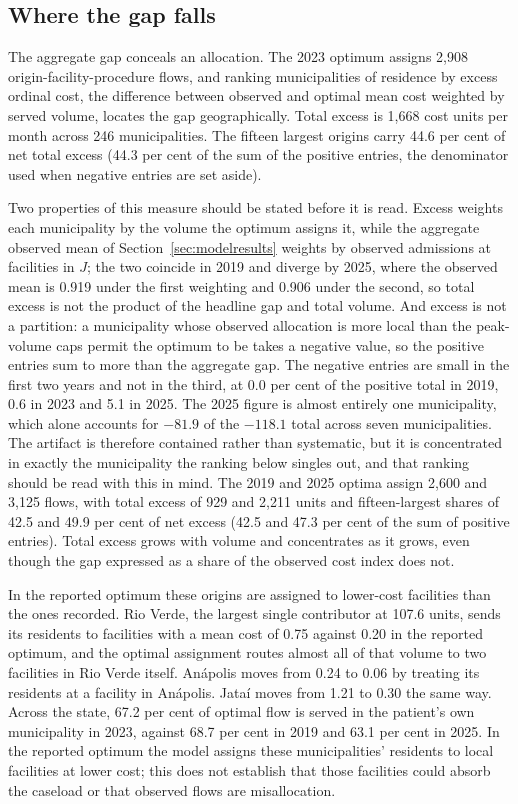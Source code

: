 \subsection{Where the gap falls}
\label{sec:flows}

The aggregate gap conceals an allocation. The 2023 optimum assigns 2{,}908
origin-facility-procedure flows, and ranking municipalities of residence by excess ordinal cost, the difference between observed and optimal mean cost weighted by
served volume, locates the gap geographically. Total excess is 1{,}668 cost
units per month across 246 municipalities. The fifteen largest origins carry 44.6
per cent of net total excess (44.3 per cent of the sum of the positive entries, the denominator
used when negative entries are set aside).

Two properties of this measure should be stated before it is read. Excess weights
each municipality by the volume the optimum assigns it, while the aggregate
observed mean of Section~\ref{sec:modelresults} weights by observed admissions at
facilities in $J$; the two coincide in 2019 and diverge by 2025, where the
observed mean is 0.919 under the first weighting and 0.906 under the second, so
total excess is not the product of the headline gap and total volume. And excess
is not a partition: a municipality whose observed allocation is more local than
the peak-volume caps permit the optimum to be takes a negative value, so the
positive entries sum to more than the aggregate gap. The negative entries are
small in the first two years and not in the third, at 0.0 per cent of the
positive total in 2019, 0.6 in 2023 and 5.1 in 2025. The 2025 figure is almost
entirely one municipality, which alone accounts for $-81.9$ of the $-118.1$ total across
seven municipalities. The artifact is therefore contained rather than systematic,
but it is concentrated in exactly the municipality the ranking below singles
out, and that ranking should be read with this in mind. The 2019 and 2025 optima
assign 2{,}600 and 3{,}125 flows, with total excess of 929 and 2{,}211 units and
fifteen-largest shares of 42.5 and 49.9 per cent of net excess (42.5 and 47.3 per cent of the sum of positive entries). Total excess grows with volume
and concentrates as it grows, even though the gap expressed as a share of the observed cost index does not.

In the reported optimum these origins are assigned to lower-cost facilities than the ones recorded. Rio Verde, the largest
single contributor at 107.6 units, sends its residents to facilities with a mean
cost of 0.75 against 0.20 in the reported optimum, and the optimal assignment
routes almost all of that volume to two facilities in Rio Verde itself. An\'apolis
moves from 0.24 to 0.06 by treating its residents at a facility in An\'apolis.
Jata\'i moves from 1.21 to 0.30 the same way. Across the state, 67.2 per cent of
optimal flow is served in the patient's own municipality in 2023, against 68.7
per cent in 2019 and 63.1 per cent in 2025. In the reported optimum the model assigns these municipalities' residents to local facilities at lower cost; this does not establish that those facilities could absorb the caseload or that observed flows are misallocation.

